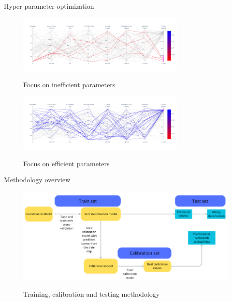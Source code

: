 \documentclass{beamer}
\begin{document}
\begin{frame}{Hyper-parameter optimization}
\begin{figure}[h]
    \centering
    \includegraphics[width=0.75\textwidth]{Random search XGB 2.png}\\
    \caption{Focus on inefficient parameters}
    \label{fig:Random search XGB 2}
\end{figure}
\begin{figure}[h]
    \centering
    \includegraphics[width=0.75\textwidth]{Random search XGB 3.png}\\
    \caption{Focus on efficient parameters}
    \label{fig:Random search XGB 3}
\end{figure}
\end{frame}

\begin{frame}{Methodology overview}
\begin{figure}[h]
    \centering
    \includegraphics[width=1\textwidth]{Methodology.png}\\
    \caption{Training, calibration and testing methodology}
    \label{fig:Methodogoly}
\end{figure}
\end{frame}
\end{document}
